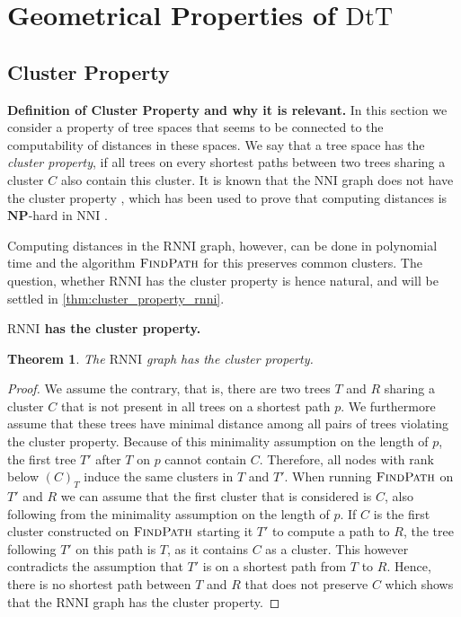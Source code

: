 \documentclass[11pt]{amsart}
\newtheorem{theorem}{Theorem}
\newcommand{\rnni}{\mathrm{RNNI}}
\newcommand{\findpath}{\textsc{FindPath}}
\newcommand{\nni}{\mathrm{NNI}}
\newcommand{\dtt}{\mathrm{DtT}}
\newcommand{\np}{\mathbf{NP}}
\newcommand{\summary}[1]{\textbf{#1}} %
\begin{document}
\section{Geometrical Properties of $\dtt$}

\subsection{Cluster Property}
\summary{Definition of Cluster Property and why it is relevant.}
In this section we consider a property of tree spaces that seems to be connected to the computability of distances in these spaces.
We say that a tree space has the \emph{cluster property}, if all trees on every shortest paths between two trees sharing a cluster $C$ also contain this cluster.
It is known that the $\nni$ graph does not have the cluster property \autocite{Li1996-zw}, which has been used to prove that computing distances is $\np$-hard in $\nni$ \autocite{Dasgupta2000-xa}.

Computing distances in the $\rnni$ graph, however, can be done in polynomial time and the algorithm $\findpath$ for this \autocite{Collienne2020-iu} preserves common clusters.
The question, whether $\rnni$ has the cluster property is hence natural, and will be settled in \autoref{thm:cluster_property_rnni}.

\summary{$\rnni$ has the cluster property.}
\begin{theorem}
	The $\rnni$ graph has the cluster property.
	\label{thm:cluster_property_rnni}
\end{theorem}

\begin{proof}
	We assume the contrary, that is, there are two trees $T$ and $R$ sharing a cluster $C$ that is not present in all trees on a shortest path $p$.
	We furthermore assume that these trees have minimal distance among all pairs of trees violating the cluster property.
	Because of this minimality assumption on the length of $p$, the first tree $T'$ after $T$ on $p$ cannot contain $C$.
	Therefore, all nodes with rank below $(C)_T$ induce the same clusters in $T$ and $T'$.
	When running $\findpath$ on $T'$ and $R$ we can assume that the first cluster that is considered is $C$, also following from the minimality assumption on the length of $p$.
	If $C$ is the first cluster constructed on $\findpath$ starting it $T'$ to compute a path to $R$, the tree following $T'$ on this path is $T$, as it contains $C$ as a cluster.
	This however contradicts the assumption that $T'$ is on a shortest path from $T$ to $R$.
	Hence, there is no shortest path between $T$ and $R$ that does not preserve $C$ which shows that the $\rnni$ graph has the cluster property.
\end{proof}
\end{document}

